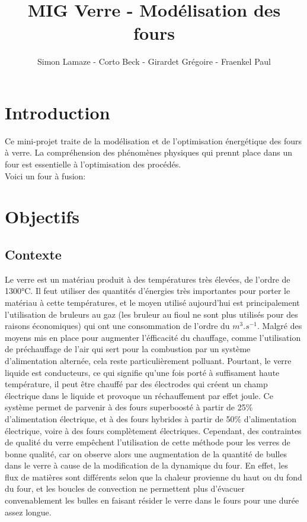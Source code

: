 \documentclass[12pt, a4paper, french, BCOR = 0pt, DIV = 10]{scrartcl}
\title{MIG Verre - Modélisation des fours}
\author{\small{Simon Lamaze - Corto Beck - Girardet Grégoire - Fraenkel Paul}}
\begin{document}
    \raggedright
    \maketitle
    
    \section{Introduction}
    Ce mini-projet traite de la modélisation et de l'optimisation énergétique des fours à verre.  La compréhension des phénomènes physiques qui prennt place dans un four est essentielle à l'optimisation des procédés. \\ [0.5 cm]
    Voici un four à fusion:
    

    \section{Objectifs}
    \subsection{Contexte}
    Le verre est un matériau produit à des températures très élevées, de l'ordre de 1300°C. Il feut utiliser des quantités d'énergies très importantes pour porter le matériau à cette températures, et le moyen utilisé aujourd'hui est principalement l'utilisation de bruleurs au gaz (les bruleur au fioul ne sont plus utilisés pour des raisons économiques) qui ont une consommation de l'ordre du $m^{3}.s^{-1}$. Malgré des moyens mis en place pour augmenter l'éfficacité du chauffage, comme l'utilisation de préchauffage de l'air qui sert pour la combustion par un système d'alimentation alternée, cela reste particulièrement polluant. Pourtant, le verre liquide est conducteurs, ce qui signifie qu'une fois porté à suffisament haute température, il peut être chauffé par des électrodes qui créent un champ électrique dans le liquide et provoque un réchauffement par effet joule. Ce système permet de parvenir à des fours superboosté à partir de 25\% d'alimentation électrique, et à des fours hybrides à partir de 50\% d'alimentation électrique, voire à des fours complètement électriques. Cependant, des contraintes de qualité du verre empêchent l'utilisation de cette méthode pour les verres de bonne qualité, car on observe alors une augmentation de la quantité de bulles dans le verre à cause de la modification de la dynamique du four. En effet, les flux de matières sont différents selon que la chaleur provienne du haut ou du fond du four, et les boucles de convection ne permettent plus d'évacuer convenablement les bulles en faisant résider le verre dans le fours pour une durée assez longue.
\end{document}

